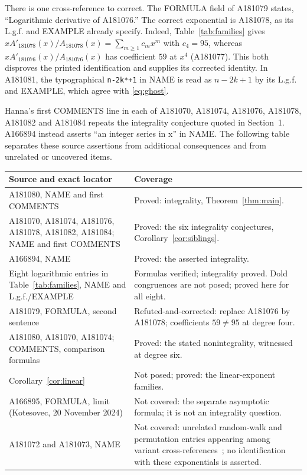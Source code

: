 \documentclass[11pt]{article}
\begin{document}
There is one cross-reference to correct. The FORMULA field of A181079
states, ``Logarithmic derivative of A181076.'' The correct exponential is
A181078, as its L.g.f. and EXAMPLE already specify. Indeed, Table~\ref{tab:families}
gives $xA'_{181078}(x)/A_{181078}(x)=\sum_{m\geq1}c_mx^m$
with $c_4=95$, whereas $xA'_{181076}(x)/A_{181076}(x)$ has coefficient
$59$ at $x^4$ (A181077). This both disproves the printed identification
and supplies its corrected identity. In A181081, the typographical
\texttt{n-2k*+1} in NAME is read as $n-2k+1$ by its L.g.f. and EXAMPLE,
which agree with \eqref{eq:ghost}.

Hanna's first COMMENTS line in each of A181070, A181074, A181076,
A181078, A181082 and A181084 repeats the integrality conjecture quoted
in Section~1. A166894 instead asserts ``an integer series in x'' in NAME.
The following table separates these source assertions from additional
consequences and from unrelated or uncovered items.
\begin{center}\small
\begin{tabular}{@{}>{\raggedright\arraybackslash}p{.31\linewidth}>{\raggedright\arraybackslash}p{.64\linewidth}@{}}\toprule
Source and exact locator & Coverage\\\midrule
A181080, NAME and first COMMENTS & Proved: integrality, Theorem~\ref{thm:main}.\\
A181070, A181074, A181076, A181078, A181082, A181084; NAME and first COMMENTS
 & Proved: the six integrality conjectures, Corollary~\ref{cor:siblings}.\\
A166894, NAME & Proved: the asserted integrality.\\
Eight logarithmic entries in Table~\ref{tab:families}, NAME and L.g.f./EXAMPLE
 & Formulas verified; integrality proved. Dold congruences are not posed;
 proved here for all eight.\\
A181079, FORMULA, second sentence & Refuted-and-corrected: replace A181076 by
A181078; coefficients $59\ne95$ at degree four.\\
A181080, A181070, A181074; COMMENTS, comparison formulas
 & Proved: the stated nonintegrality, witnessed at degree six.\\
Corollary~\ref{cor:linear} & Not posed; proved: the linear-exponent families.\\
A166895, FORMULA, limit (Kotesovec, 20 November 2024)
 & Not covered: the separate asymptotic formula; it is not an integrality question.\\
A181072 and A181073, NAME & Not covered: unrelated random-walk and permutation
entries appearing among variant cross-references~\cite{Hmisc}; no identification
with these exponentials is asserted.\\\bottomrule
\end{tabular}
\end{center}
\end{document}
